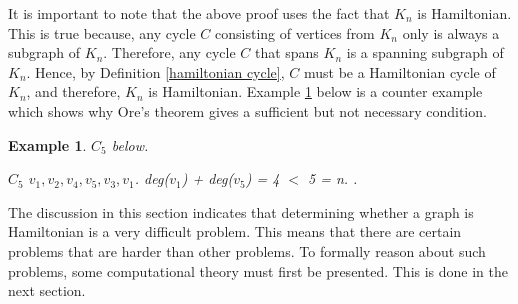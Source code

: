 \documentclass[12pt]{article}
\newtheorem{example}[definition]{Example}
\numberwithin{equation}{subsection}
\numberwithin{table}{subsection}
\numberwithin{algorithm}{subsection}
\numberwithin{figure}{subsection}
\begin{document}
It is important to note that the above proof uses the fact that $K_n$ is Hamiltonian. This is true because, any cycle $C$ consisting of vertices from $K_n$ only is always a subgraph of $K_n$. Therefore, any cycle $C$ that spans $K_n$ is a spanning subgraph of $K_n$. Hence, by Definition \ref{hamiltonian cycle}, $C$ must be a Hamiltonian cycle of $K_n$, and therefore, $K_n$ is Hamiltonian. Example \ref{example 6} below is a counter example which shows why Ore's theorem gives a sufficient but not necessary condition.\\
\begin{example}
\label{example 6}
{} $C_5$ below.
\\
\begin{center}
\end{center}
$C_5$ {} $v_1, v_2, v_4, v_5, v_3, v_1$. {} deg($v_1$) + deg($v_5$) = 4 $<$ 5 = n. {}.
\end{example} 
The discussion in this section indicates that determining whether a graph is Hamiltonian is a very difficult problem. This means that there are certain problems that are harder than other problems. To formally reason about such problems, some computational theory must first be presented. This is done in the next section.
\end{document}

